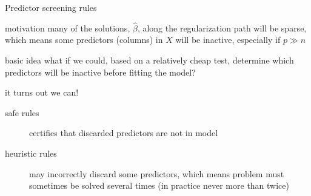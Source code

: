 \documentclass[10pt,ignorenonframetext]{beamer}
\begin{document}

\begin{frame}{Predictor screening rules}
  \begin{block}{motivation}
    many of the solutions, \(\hat\beta\),
    along the regularization path will be \alert{sparse}, which means some
    predictors (columns) in \(X\) will be \alert{inactive}, especially
    if \(p \gg n\)\medskip
  \end{block}
  \pause
  \begin{block}{basic idea}
    what if we could, based on a relatively \alert{cheap} test, determine which
    predictors will be inactive before fitting the model?
  \end{block}
  \pause
  \begin{block}{it turns out we can!}
    \begin{description}
      \item[safe rules] certifies that discarded predictors are not in model
      \item[heuristic rules] may incorrectly discard some predictors, which means problem must
            sometimes be solved several times (in practice never more than twice)
    \end{description}
  \end{block}
\end{frame}
\end{document}
